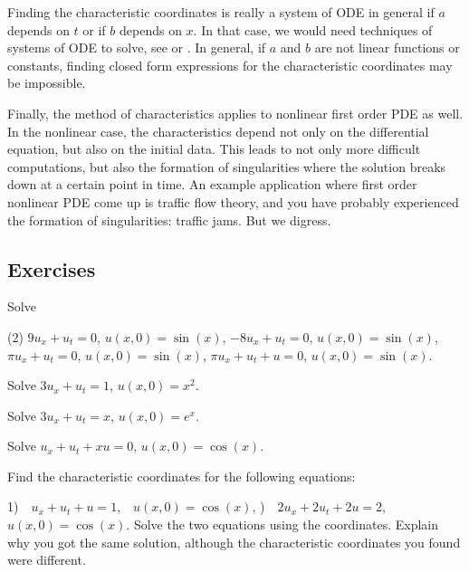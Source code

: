 Finding the characteristic coordinates is really
a system of ODE in general if $a$ depends on $t$ or if $b$ depends on $x$.
In that case, we would need techniques of systems of ODE
to solve, see  or .  In
general, if $a$ and $b$ are not linear functions or constants, finding closed
form expressions for the characteristic coordinates may be impossible.

Finally, the method of characteristics applies to nonlinear first order PDE
as well.  In the nonlinear case, the characteristics depend not only
on the differential equation, but also on the initial data.  This leads to
not only more difficult computations, but also the formation of
singularities where the solution breaks down at a certain point in time.
An example application where first order nonlinear PDE come
up is traffic flow theory, and you have probably experienced the
formation of singularities: traffic jams.  But we digress.

\subsection{Exercises}

\begin{exercise}
Solve
\begin{tasks}(2)
\task $9u_x + u_t = 0$, \enspace $u(x,0) = \sin(x)$,
\task $-8u_x + u_t = 0$, \enspace $u(x,0) = \sin(x)$,
\task $\pi u_x + u_t = 0$, \enspace $u(x,0) = \sin(x)$,
\task $\pi u_x + u_t + u = 0$, \enspace $u(x,0) = \sin(x)$.
\end{tasks}
\end{exercise}

\begin{exercise}
Solve $3u_x + u_t = 1$, $u(x,0) = x^2$.
\end{exercise}

\begin{exercise}
Solve $3u_x + u_t = x$, $u(x,0) = e^x$.
\end{exercise}

\begin{exercise}
Solve $u_x+u_t+xu = 0$, $u(x,0) = \cos(x)$.
\end{exercise}

\begin{exercise}
\leavevmode
\begin{tasks}
\task Find the characteristic coordinates for the
following equations:

1)~~$u_x+u_t + u = 1$,~~$u(x,0) = \cos(x)$,
)~~$2u_x+2u_t +2u = 2$,~~$u(x,0) = \cos(x)$.
\task Solve the two equations using the coordinates.
\task Explain why
you got the same solution, although the characteristic coordinates
you found were different.
\end{tasks}
\end{exercise}

